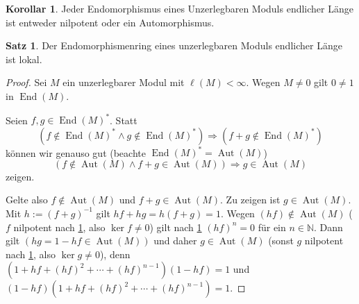 \documentclass[
twoside=semi,
fontsize=12,
DIV=12, 
cleardoublepage=current,
leqno,
headings=optiontoheadandtoc, 
toc=idx
]{scrbook}
\newcommand{\N}{\mathbb{N}}
\DeclareMathOperator{\End}{End}
\DeclareMathOperator{\Aut}{Aut}
\theoremstyle{definition}
\newtheorem{satz}[definition]{Satz}
\newtheorem{korollar}[definition]{Korollar}
\begin{document}
	\begin{korollar}\label{1.5.11}
		Jeder Endomorphismus eines Unzerlegbaren Moduls endlicher L\"ange ist entweder nilpotent oder ein Automorphismus.
	\end{korollar}

	\begin{satz}\label{1.5.12}
		Der Endomorphismenring eines unzerlegbaren Moduls endlicher L\"ange ist lokal.
		
		\begin{proof}
			Sei $M$ ein unzerlegbarer Modul mit $\ell(M) < \infty$. Wegen $M \neq 0$ gilt $0 \neq 1$ in $\End(M)$.
			
			Seien $f, g \in \End(M)^*$. Statt 
				\[(f\notin \End(M)^* \land g\notin \End(M)^*) \Rightarrow (f+g \notin \End(M)^*)\]
			k\"onnen wir genauso gut (beachte $\End(M)^* = \Aut(M)$)
				\[(f\notin \Aut(M) \land f+g \in \Aut(M)) \Rightarrow g \in \Aut(M)\]
			zeigen.
			
		Gelte also $f \notin \Aut(M)$ und $f+g \in \Aut(M)$. Zu zeigen ist $g \in \Aut(M)$.
		Mit $h:= (f+g)^{-1}$ gilt $hf + hg = h(f+g) = 1$. Wegen $(hf) \notin \Aut(M)$ ($f$ nilpotent nach \ref{1.5.11}, also $\ker f \neq 0$) gilt nach \ref{1.5.11}
		$(hf)^n = 0$ f\"ur ein $n \in \N$. Dann gilt $(hg = 1 - hf \in \Aut(M))$ und daher $g \in \Aut(M)$ (sonst $g$ nilpotent nach \ref{1.5.11}, also $\ker g \neq 0$),
		denn $(1+hf+(hf)^2 + \cdots + (hf)^{n-1})(1-hf) = 1$ und $(1-hf)(1+hf+(hf)^2 + \cdots + (hf)^{n-1}) = 1$.
		\end{proof}
	\end{satz}
\end{document}
